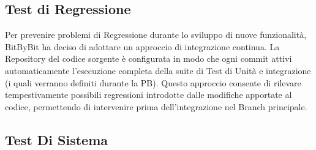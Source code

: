 \documentclass[a4paper,12pt]{article}
\begin{document}
\subsection{Test di Regressione}
Per prevenire problemi di Regressione durante lo sviluppo di nuove funzionalità,
BitByBit ha deciso di adottare un approccio di integrazione continua.
La Repository del codice sorgente è configurata in modo che ogni commit
attivi automaticamente l'esecuzione completa della suite di Test di Unità e
integrazione (i quali verranno definiti durante la PB). Questo approccio consente di rilevare tempestivamente possibili regressioni introdotte dalle modifiche apportate al codice, permettendo di intervenire prima dell'integrazione nel
Branch principale.

\clearpage
\begingroup

\subsection{Test Di Sistema}
\renewcommand{\arraystretch}{1.2}
\end{document}
